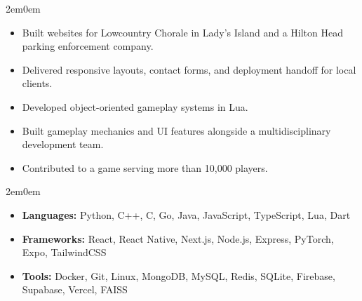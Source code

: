 \documentclass{my_cv}
\begin{document}
\begin{adjustwidth}{2em}{0em}


\begin{itemize}
    \item Built websites for Lowcountry Chorale in Lady's Island and a Hilton Head parking enforcement company.
    \item Delivered responsive layouts, contact forms, and deployment handoff for local clients.
\end{itemize}



\begin{itemize}
    \item Developed object-oriented gameplay systems in Lua.
    \item Built gameplay mechanics and UI features alongside a multidisciplinary development team.
    \item Contributed to a game serving more than 10,000 players.
\end{itemize}


\end{adjustwidth}

\raggedright
\begin{adjustwidth}{2em}{0em}

\begin{itemize}
    \item \textbf{Languages:} Python, C++, C, Go, Java, JavaScript, TypeScript, Lua, Dart
    \item \textbf{Frameworks:} React, React Native, Next.js, Node.js, Express, PyTorch, Expo, TailwindCSS
    \item \textbf{Tools:} Docker, Git, Linux, MongoDB, MySQL, Redis, SQLite, Firebase, Supabase, Vercel, FAISS
\end{itemize}

\end{adjustwidth}
\end{document}

